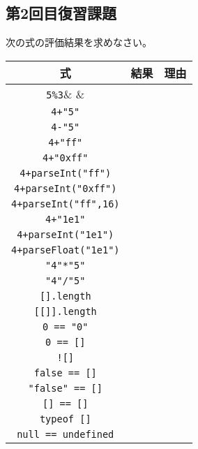 \subsection{第2回目復習課題}
\newcommand{\Rule}{\rule[-2ex]{0em}{5ex}}
次の式の評価結果を求めなさい。
\begin{center}
 \begin{tabular}{|>{\Rule}c|p{}|p{}|}\hline
  式&\multicolumn{1}{c|}{結果} &\multicolumn{1}{c|}{理由} \\\hline
  \Verb+5%
  \Verb-4+"5"-& & \\ \hline
  \Verb+4-"5"+& & \\ \hline
  \Verb-4+"ff"-& & \\ \hline
  \Verb-4+"0xff"-& & \\ \hline
  \Verb-4+parseInt("ff")-& & \\ \hline
  \Verb-4+parseInt("0xff")-& & \\ \hline
  \Verb-4+parseInt("ff",16)-& & \\ \hline
  \Verb-4+"1e1"-& & \\ \hline
  \Verb-4+parseInt("1e1")-& & \\ \hline
  \Verb-4+parseFloat("1e1")-& & \\ \hline
  \Verb+"4"*"5"+& & \\ \hline
  \Verb+"4"/"5"+& & \\ \hline
  \Verb+[].length+& & \\ \hline
  \Verb+[[]].length+& & \\ \hline
  \Verb+0 == "0"+& & \\ \hline
  \Verb+0 == []+& & \\ \hline
  \Verb+![]+& & \\ \hline
  \Verb+false == []+& & \\ \hline
  \Verb+"false" == []+& & \\ \hline
  \Verb+[] == []+& & \\ \hline
  \Verb+typeof []+& & \\ \hline
  \Verb+null == undefined+& & \\ \hline
 \end{tabular}
\end{center}
